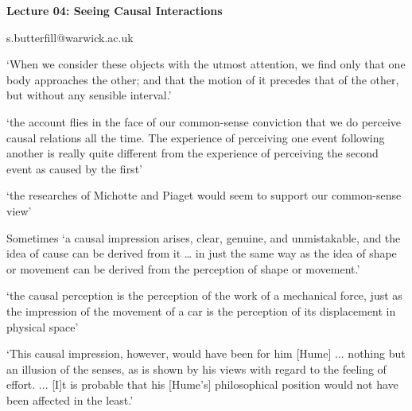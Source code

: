 \documentclass[12pt]{extarticle}
\date{}
\makeatletter
\def \ititle {Origins of Mind}
\def \iemail{s.butterfill@warwick.ac.uk}
\makeatother
\begin{document}
\begin{multicols*}{3}

\setlength\footnotesep{1em}











\def \ititle {Lecture 04: Seeing Causal Interactions}

\begin{center}

{\Large

\textbf{\ititle}

}



\iemail %

\end{center}

‘When we consider these objects with the utmost attention, we find only
that one body approaches the other; and that the motion of it precedes
that of the other, but without any sensible interval.’ \citep[p.~77]{Hume:1739lj}

‘the account flies in the face of our common-sense conviction that we do
perceive causal relations all the time. The experience of perceiving one
event following another is really quite different from the experience of
perceiving the second event as caused by the first’

‘the researches of Michotte and Piaget would seem to support our
common-sense view’
\citep[pp.~114-5]{Searle:1983tx}

Sometimes ‘a causal impression arises, clear,
genuine, and unmistakable, and the idea of cause can be derived from it
… in just the same way as the idea of shape or movement can be derived
from the perception of shape or movement.’
\citep[p.~270--1]{Michotte:1946nz}

‘the causal perception is the perception of the work of a mechanical force,
just as the impression of the movement of a car is the perception of its
displacement in physical space’
\citep[p.~228]{Michotte:1946nz}

‘This causal impression, however, would have been for him [Hume] ...
nothing but an illusion of the senses, as is shown by his
views with regard to the feeling of effort. ... [I]t is probable that his
[Hume’s] philosophical position would not have been affected in the
least.’
\citep[p.~256]{Michotte:1946nz}


\end{multicols*}
\end{document}
